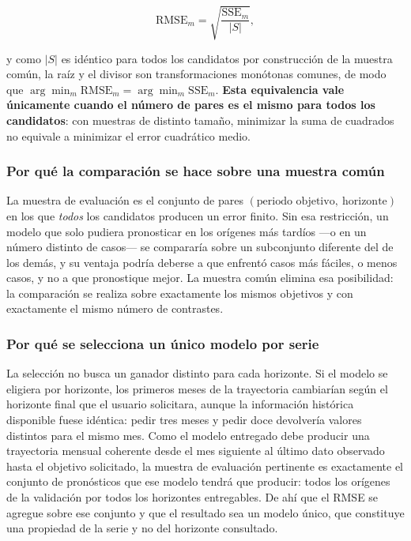 \documentclass[12pt,letterpaper]{article}
\begin{document}
\begin{equation}
\mathrm{RMSE}_m=\sqrt{\frac{\mathrm{SSE}_m}{|S|}},
\label{eq:rmse_sse}
\end{equation}

y como \(|S|\) es idéntico para todos los candidatos por construcción de la muestra común, la raíz y el divisor son transformaciones monótonas comunes, de modo que \(\arg\min_m \mathrm{RMSE}_m=\arg\min_m \mathrm{SSE}_m\). \textbf{Esta equivalencia vale únicamente cuando el número de pares es el mismo para todos los candidatos}: con muestras de distinto tamaño, minimizar la suma de cuadrados no equivale a minimizar el error cuadrático medio.

\subsubsection*{Por qué la comparación se hace sobre una muestra común}

La muestra de evaluación es el conjunto de pares \((\text{periodo objetivo},\ \text{horizonte})\) en los que \emph{todos} los candidatos producen un error finito. Sin esa restricción, un modelo que solo pudiera pronosticar en los orígenes más tardíos ---o en un número distinto de casos--- se compararía sobre un subconjunto diferente del de los demás, y su ventaja podría deberse a que enfrentó casos más fáciles, o menos casos, y no a que pronostique mejor. La muestra común elimina esa posibilidad: la comparación se realiza sobre exactamente los mismos objetivos y con exactamente el mismo número de contrastes.

\subsubsection*{Por qué se selecciona un único modelo por serie}

La selección no busca un ganador distinto para cada horizonte. Si el modelo se eligiera por horizonte, los primeros meses de la trayectoria cambiarían según el horizonte final que el usuario solicitara, aunque la información histórica disponible fuese idéntica: pedir tres meses y pedir doce devolvería valores distintos para el mismo mes. Como el modelo entregado debe producir una trayectoria mensual coherente desde el mes siguiente al último dato observado hasta el objetivo solicitado, la muestra de evaluación pertinente es exactamente el conjunto de pronósticos que ese modelo tendrá que producir: todos los orígenes de la validación por todos los horizontes entregables. De ahí que el RMSE se agregue sobre ese conjunto y que el resultado sea un modelo único, que constituye una propiedad de la serie y no del horizonte consultado.
\end{document}
